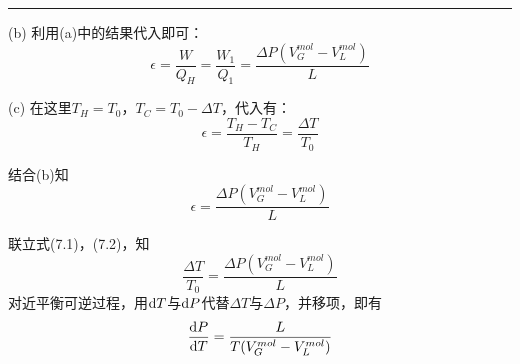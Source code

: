 \begin{solution}
{    }
    \vspace*{1ex}
    \hrule
    \vspace*{1ex}
    (b) 利用(a)中的结果代入即可：
    \begin{equation*}
        \epsilon = \frac{W}{Q_H} =\frac{W_1}{Q_1}=\frac{\Delta P(V_{G}^{mol}-V_{L}^{mol})}{L}
    \end{equation*}

    (c) 在这里$T_H = T_{0}$，$T_C =T_{0} - \Delta T$，代入有：
    \begin{equation}
        \epsilon = \frac{T_H-T_C}{T_H}=\frac{\Delta T}{T_{0}}
    \end{equation}

    结合(b)知
    \begin{equation}
        \epsilon = \frac{\Delta P(V_{G}^{mol}-V_{L}^{mol})}{L}
    \end{equation}

    联立式(7.1)，(7.2)，知
    \[
        \frac{\Delta T}{T_{0}}=\frac{\Delta P(V_{G}^{mol}-V_{L}^{mol})}{L}
    \]
    对近平衡可逆过程，用$\dif T$与$\dif P$代替$\Delta T$与$\Delta P$，并移项，即有
    \begin{equation*}
        \frac{\dif{P}}{\dif{T}}=\frac{L}{T(V_{G}^{mol}-V_{L}^{mol})}
    \end{equation*}
\end{solution}
